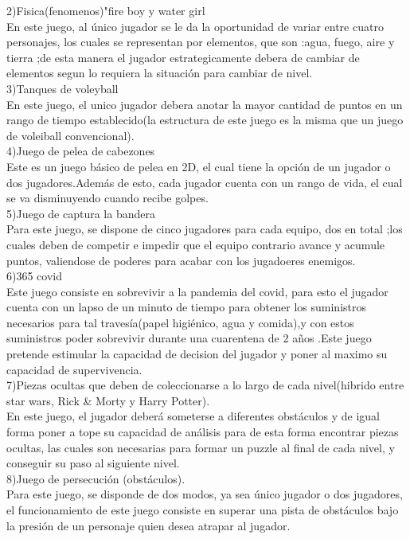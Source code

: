 \documentclass{article}
\begin{document}
2)Fisica(fenomenos)"fire boy y water girl\\
En este juego, al único jugador se le da la oportunidad de variar entre cuatro personajes, los cuales se representan por elementos, que son :agua, fuego, aire y tierra ;de esta manera el jugador estrategicamente debera de cambiar de elementos segun lo requiera la situación para cambiar de nivel.\\

3)Tanques de voleyball\\
En este juego, el unico jugador debera anotar la mayor cantidad de puntos en un rango de tiempo establecido(la estructura de este juego es la misma que un juego de voleiball convencional).\\

4)Juego de pelea de cabezones\\
Este es un juego básico de pelea en 2D, el cual tiene la opción de un jugador o dos jugadores.Además de esto, cada jugador cuenta con un rango de vida, el cual se va disminuyendo cuando recibe golpes.\\

5)Juego de captura la bandera\\
Para este juego, se dispone de cinco jugadores para cada equipo, dos en total ;los cuales deben de competir e impedir que el equipo contrario avance y acumule puntos, valiendose de poderes para acabar con los jugadoeres enemigos.\\

6)365 covid\\
Este juego consiste en sobrevivir a la pandemia del covid, para esto el jugador cuenta con un lapso de un minuto de tiempo para obtener los suministros necesarios para tal travesía(papel higiénico, agua y comida),y con estos suministros poder sobrevivir durante una cuarentena de 2 años .Este juego pretende estimular la capacidad de decision del jugador y poner al maximo su capacidad de supervivencia.\\

 7)Piezas ocultas que deben de coleccionarse a lo largo de cada nivel(hibrido entre star wars, Rick & Morty y Harry Potter).\\
En este juego, el jugador deberá someterse a diferentes obstáculos y de igual forma poner a tope su capacidad de análisis para de esta forma encontrar piezas ocultas, las cuales son necesarias para formar un puzzle al final de cada nivel, y conseguir su paso al siguiente nivel.\\

8)Juego de persecución (obstáculos).\\
Para este juego, se disponde de dos modos, ya sea único jugador o dos jugadores, el funcionamiento de este juego consiste en superar una pista de obstáculos bajo la presión de un personaje quien desea atrapar al jugador.\\ 


\end{document}
